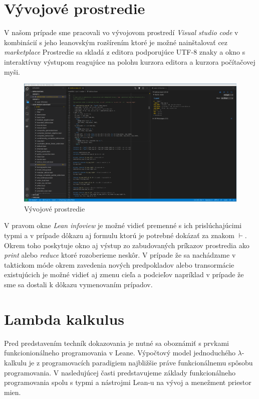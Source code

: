 \documentclass[a4paper,10pt,oneside]{report}%
\begin{document}
\section{Vývojové prostredie}
    V našom prípade sme pracovali vo vývojovom prostredí \emph{Visual studio code}
v kombinácií s jeho leanovským rozšírením ktoré je možné nainštalovať cez
\emph{marketplace} Prostredie sa skladá z editora podporujúce UTF-8 znaky a okno s
interaktívny výstupom reagujúce na polohu kurzora editora a kurzora počítačovej
myši.
\begin{center}
    \begin{figure}[!ht]
        \centering
        \includegraphics[scale=0.25]{vscode_printscreen.png}
        \caption{Vývojové prostredie}
    \end{figure}
\end{center}
    V pravom okne \emph{Lean infoview} je možné vidieť premenné s ich prislúchajúcimi
typmi a v prípade dôkazu aj formulu ktorú je potrebné dokázať za znakom $\vdash$.
    Okrem toho poskytuje okno aj výstup zo zabudovaných príkazov prostredia
ako \emph{print} alebo \emph{reduce} ktoré rozoberieme neskôr.
    V prípade že sa nachádzame v taktickom móde okrem zavedenia nových predpokladov
alebo transormácie existujúcich je možné vidieť aj zmenu cieľa a podcieľov
napríklad v prípade že sme sa dostali k dôkazu vymenovaním prípadov.
\section{Lambda kalkulus}
Pred predstavením techník dokazovania je nutné sa oboznámiť s prvkami funkcionionálneho
    programovania v Leane.
Výpočtový model jednoduchého $\lambda$-kalkulu je z programovacích paradigiem najbližšie
práve funkcionálnemu spôsobu programovania.
V nasledujúcej časti predstavujeme základy funkcionálneho programovania spolu
    s typmi a nástrojmi Lean-u na vývoj a menežment priestor mien.
\end{document}
